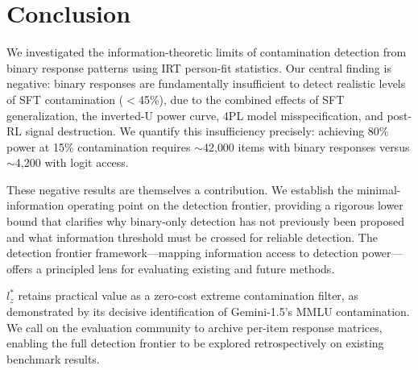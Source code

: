 \documentclass[11pt,a4paper]{article}
\newcommand{\lzstar}{$l_{z}^{*}$}
\begin{document}
\section{Conclusion}

We investigated the information-theoretic limits of contamination detection from binary response patterns using IRT person-fit statistics. Our central finding is negative: binary responses are fundamentally insufficient to detect realistic levels of SFT contamination ($<$45\%), due to the combined effects of SFT generalization, the inverted-U power curve, 4PL model misspecification, and post-RL signal destruction. We quantify this insufficiency precisely: achieving 80\% power at 15\% contamination requires $\sim$42{,}000 items with binary responses versus $\sim$4{,}200 with logit access.

These negative results are themselves a contribution. We establish the minimal-information operating point on the detection frontier, providing a rigorous lower bound that clarifies why binary-only detection has not previously been proposed and what information threshold must be crossed for reliable detection. The detection frontier framework---mapping information access to detection power---offers a principled lens for evaluating existing and future methods.

\lzstar{} retains practical value as a zero-cost extreme contamination filter, as demonstrated by its decisive identification of Gemini-1.5's MMLU contamination. We call on the evaluation community to archive per-item response matrices, enabling the full detection frontier to be explored retrospectively on existing benchmark results.
\end{document}
